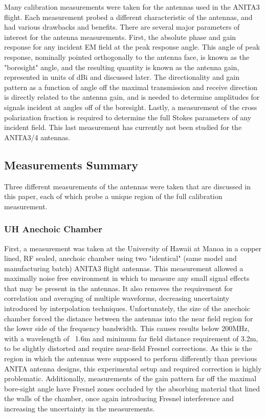 	Many calibration measurements were taken for the antennas used in the ANITA3 flight.  Each measurement probed a different characteristic of the antennas, and had various drawbacks and benefits.  There are several major parameters of interest for the antenna measurements. First, the absolute phase and gain response for any incident EM field at the peak response angle.  This angle of peak response, nominally pointed orthogonally to the antenna face, is known as the "boresight" angle, and the resulting quantity is known as the antenna gain, represented in units of dBi and discussed later. The directionality and gain pattern as a function of angle off the maximal transmission and receive direction is directly related to the antenna gain, and is needed to determine amplitudes for signals incident at angles off of the boresight.   Lastly, a measurement of the cross polarization fraction is required to determine the full Stokes parameters of any incident field.  This last measurement has currently not been studied for the ANITA3/4 antennas.
	
	\subsection{Measurements Summary}
	
	Three different measurements of the antennas were taken that are discussed in this paper, each of which probe a unique region of the full calibration measurement.  
	
		\subsubsection{UH Anechoic Chamber}
		First, a measurement was taken at the University of Hawaii at Manoa in a copper lined, RF sealed, anechoic chamber using two "identical" (same model and manufacturing batch) ANITA3 flight antennas.  This measurement allowed a maximally noise free environment in which to measure any small signal effects that may be present in the antennas.  It also removes the requirement for correlation and averaging of multiple waveforms, decreasing uncertainty introduced by interpolation techniques.  Unfortunately, the size of the anechoic chamber forced the distance between the antennas into the near field region for the lower side of the frequency bandwidth.  This causes results below 200MHz, with a wavelength of ~1.6m and minimum far field distance requirement of 3.2m, to be slightly distorted and require near-field Fresnel corrections. As this is the region in which the antennas were supposed to perform differently than previous ANITA antenna designs, this experimental setup and required correction is highly problematic.  Additionally, measurements of the gain pattern far off the maximal bore-sight angle have Fresnel zones occluded by the absorbing material that lined the walls of the chamber, once again introducing Fresnel interference and increasing the uncertainty in the measurements.
		
